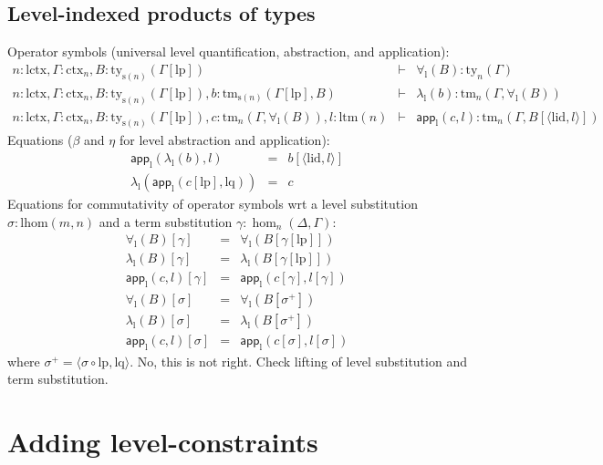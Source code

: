 \documentclass[11pt,a4paper]{article}
\theoremstyle{definition}
\newcommand{\app}[2]{{#1\,#2}} %
\def\lhom{\mathrm{lhom}}
\def\lctx{\mathrm{lctx}}
\def\ltm{\mathrm{ltm}}
\def\lp{\mathrm{lp}}
\def\lq{\mathrm{lq}}
\def\s{\mathrm{s}}
\def\lid{\mathrm{lid}}
\newcommand{\ctx}{\mathrm{ctx}}
\newcommand{\ty}{\mathrm{ty}}
\newcommand{\tm}{\mathrm{tm}}
\newcommand{\tuple}[1]{\langle #1 \rangle}
\def\p{\mathrm{p}}
\def\q{\mathrm{q}}
\def\app{\mathsf{app}}
\begin{document}
\subsection{Level-indexed products of types}
\def\l{\mathrm{l}}
Operator symbols (universal level quantification, abstraction, and application):
\begin{eqnarray*}
n : \lctx, \Gamma : \ctx_n, B : \ty_{\s(n)}(\Gamma[\lp])&\vdash& \forall_\l(B) : \ty_n(\Gamma)\\
n : \lctx, \Gamma : \ctx_n, B : \ty_{\s(n)}(\Gamma[\lp]), b : \tm_{\s(n)}(\Gamma[\lp], B) &\vdash& \lambda_\l(b) : \tm_n(\Gamma,\forall_\l(B))\\
n : \lctx, \Gamma : \ctx_n, B : \ty_{\s(n)}(\Gamma[\lp]), c :  \tm_n(\Gamma,\forall_\l(B)), l : \ltm(n) &\vdash& \app_\l(c,l) : \tm_n(\Gamma, B[\tuple{\lid,l}])
\end{eqnarray*}
Equations ($\beta$ and $\eta$ for level abstraction and application):
 \begin{eqnarray*}
 \app_\l(\lambda_\l(b),l) &=& b[\tuple{\lid,l}]\\
 \lambda_\l(\app_\l(c[\lp],\lq)) &=& c
 \end{eqnarray*}
 Equations for commutativity of operator symbols wrt a level substitution $\sigma : \lhom(m,n)$ and a term substitution $\gamma : \hom_n(\Delta,\Gamma)$:
 \begin{eqnarray*}
 \forall_\l(B)[ \gamma ] &=& \forall_\l(B[ \gamma[\lp]])\\
 \lambda_\l(B)[ \gamma ] &=& \lambda_\l(B[ \gamma[\lp]])\\
 \app_\l(c,l)[ \gamma ] &=& \app_\l(c[ \gamma ] ,l[ \gamma ] )\\
 \forall_\l(B)[ \sigma ] &=& \forall_\l(B[ \sigma^{+}])\\
 \lambda_\l(B)[ \sigma ] &=& \lambda_\l(B[ \sigma^{+}])\\
\app_\l(c,l)[ \sigma ] &=& \app_\l(c[ \sigma ] ,l[ \sigma ] )
\end{eqnarray*}
where $\sigma^+ = \tuple{\sigma \circ \lp, \lq}$. No, this is not right. Check lifting of level substitution and term substitution.

\section{Adding level-constraints}
\end{document}
